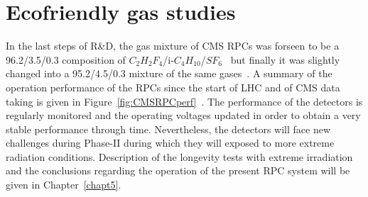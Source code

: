 \section{Ecofriendly gas studies}
\label{chapt4:sec:EcoGas}

	In the last steps of R\&D, the gas mixture of CMS RPCs was forseen to be a 96.2/3.5/0.3 composition of $C_2H_2F_4$/i-$C_4H_{10}$/$SF_6$~\cite{ABBRESCIA2005} but finally it was slightly changed into a 95.2/4.5/0.3 mixture of the same gases~\cite{THYSSEN2012}. A summary of the operation performance of the RPCs since the start of LHC and of CMS data taking is given in Figure~\ref{fig:CMSRPCperf}~\cite{SHAH2018}. The performance of the detectors is regularly monitored and the operating voltages updated in order to obtain a very stable performance through time. Nevertheless, the detectors will face new challenges during Phase-II during which they will exposed to more extreme radiation conditions. Description of the longevity tests with extreme irradiation and the conclusions regarding the operation of the present RPC system will be given in Chapter~\ref{chapt5}.
	

